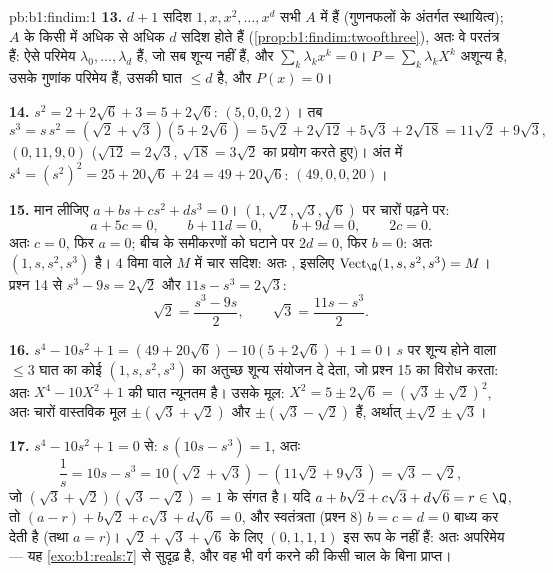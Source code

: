 \begin{solution}{pb:b1:findim:1}
\textbf{13.} $d + 1$ सदिश $1, x, x^2, \dots, x^{d}$ सभी $A$ में हैं
(गुणनफलों के अंतर्गत स्थायित्व); $A$ के किसी  में अधिक से अधिक
$d$ सदिश होते हैं (\cref{prop:b1:findim:twoofthree}), अतः वे परतंत्र हैं:
ऐसे परिमेय $\lambda_0, \dots, \lambda_d$ हैं, जो सब शून्य नहीं हैं, और
$\sum_k \lambda_k x^k = 0$।  $P = \sum_k \lambda_k X^k$ अशून्य है, उसके
गुणांक परिमेय हैं, उसकी घात $\leq d$ है, और $P(x) = 0$।

\textbf{14.} $s^2 = 2 + 2\sqrt6 + 3 = 5 + 2\sqrt6$:  $(5, 0, 0,
2)$। तब
\[
s^3 = s\,s^2 = (\sqrt2 + \sqrt3)(5 + 2\sqrt6)
= 5\sqrt2 + 2\sqrt{12} + 5\sqrt3 + 2\sqrt{18}
= 11\sqrt2 + 9\sqrt3 ,
\]
 $(0, 11, 9, 0)$ ($\sqrt{12} = 2\sqrt3$, $\sqrt{18} = 3\sqrt2$ का
प्रयोग करते हुए)। अंत में $s^4 = (s^2)^2 = 25 + 20\sqrt6 + 24 = 49 +
20\sqrt6$:  $(49, 0, 0, 20)$।

\textbf{15.} मान लीजिए $a + bs + cs^2 + ds^3 = 0$। $(1, \sqrt2, \sqrt3,
\sqrt6)$ पर चारों  पढ़ने पर:
\[
a + 5c = 0,\qquad b + 11d = 0,\qquad b + 9d = 0,\qquad 2c = 0 .
\]
अतः $c = 0$, फिर $a = 0$; बीच के समीकरणों को घटाने पर $2d = 0$, फिर $b = 0$:
अतः $(1, s, s^2, s^3)$  है। $4$ विमा वाले $M$ में चार  सदिश:
अतः , इसलिए $\operatorname{Vect}_\Q(1, s, s^2, s^3) = M$। प्रश्न 14 से
$s^3 - 9s = 2\sqrt2$ और $11s - s^3 = 2\sqrt3$:
\[
\sqrt2 = \frac{s^3 - 9s}{2},
\qquad
\sqrt3 = \frac{11s - s^3}{2} .
\]

\textbf{16.} $s^4 - 10s^2 + 1 = (49 + 20\sqrt6) - 10(5 + 2\sqrt6) + 1 = 0$।
$s$ पर शून्य होने वाला $\leq 3$ घात का कोई  $(1, s, s^2,
s^3)$ का अतुच्छ शून्य संयोजन दे देता, जो प्रश्न 15 का विरोध करता: अतः $X^4 -
10X^2 + 1$ की घात न्यूनतम है। उसके मूल: $X^2 = 5 \pm 2\sqrt6 = (\sqrt3 \pm
\sqrt2)^2$, अतः चारों वास्तविक मूल $\pm(\sqrt3 + \sqrt2)$ और $\pm(\sqrt3 -
\sqrt2)$ हैं, अर्थात् $\pm\sqrt2 \pm \sqrt3$।

\textbf{17.} $s^4 - 10s^2 + 1 = 0$ से: $s\,(10s - s^3) = 1$, अतः
\[
\frac1s = 10s - s^3 = 10(\sqrt2 + \sqrt3) - (11\sqrt2 + 9\sqrt3)
= \sqrt3 - \sqrt2 ,
\]
जो $(\sqrt3 + \sqrt2)(\sqrt3 - \sqrt2) = 1$ के संगत है। यदि $a + b\sqrt2 +
c\sqrt3 + d\sqrt6 = r \in \Q$, तो $(a - r) + b\sqrt2 + c\sqrt3 + d\sqrt6 =
0$, और स्वतंत्रता (प्रश्न 8) $b = c = d = 0$ बाध्य कर देती है (तथा $a = r$)।
$\sqrt2 + \sqrt3 + \sqrt6$ के लिए  $(0, 1, 1, 1)$ इस रूप के नहीं
हैं: अतः अपरिमेय --- यह  \cref{exo:b1:reals:7} से सुदृढ़ है, और वह भी
वर्ग करने की किसी चाल के बिना प्राप्त।


\end{solution}
